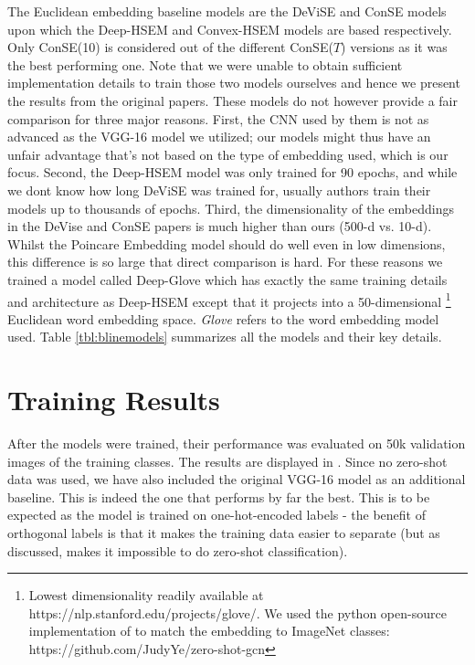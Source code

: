 \documentclass[12pt]{report}
\begin{document}
The Euclidean embedding baseline models are the DeViSE \cite{Frome2013} and ConSE \cite{Norouzi2013} models upon which the Deep-HSEM and Convex-HSEM models are based respectively. Only ConSE(10) is considered out of the different ConSE($T$) versions as it was the best performing one. Note that we were unable to obtain sufficient implementation details to train those two models ourselves and hence we present the results from the original papers. These models do not however provide a fair comparison for three major reasons. First, the CNN used by them is not as advanced as the VGG-16 model we utilized; our models might thus have an unfair advantage that's not based on the type of embedding used, which is our focus. Second, the Deep-HSEM model was only trained for 90 epochs, and while we dont know how long DeViSE was trained for, usually authors train their models up to thousands of epochs. Third, the dimensionality of the embeddings in the DeVise and ConSE papers is much higher than ours (500-d vs. 10-d). Whilst the Poincare Embedding model should do well even in low dimensions, this difference is so large that direct comparison is hard. For these reasons we trained a model called Deep-Glove which has exactly the same training details and architecture as Deep-HSEM except that it projects into a 50-dimensional \footnote{Lowest dimensionality readily available at https://nlp.stanford.edu/projects/glove/. We used the python open-source implementation of \cite{Wang2018a} to match the embedding to ImageNet classes: https://github.com/JudyYe/zero-shot-gcn} Euclidean word embedding space. \textit{Glove} \cite{Pennington2014} refers to the word embedding model used. Table \ref{tbl:blinemodels} summarizes all the models and their key details.

\section{Training Results}
After the models were trained, their performance was evaluated on 50k validation images of the training classes. The results are displayed in . Since no zero-shot data was used, we have also included the original VGG-16 model as an additional baseline. This is indeed the one that performs by far the best. This is to be expected as the model is trained on one-hot-encoded labels - the benefit of orthogonal labels is that it makes the training data easier to separate (but as discussed, makes it impossible to do zero-shot classification). 
\end{document}
